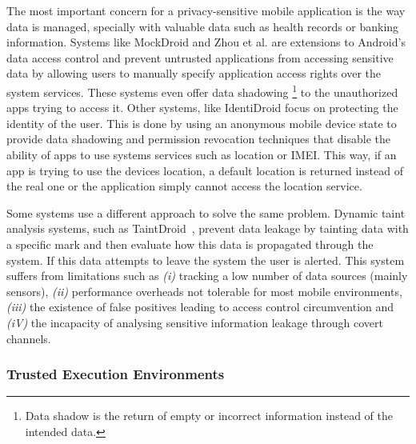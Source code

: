 The most important concern for a privacy-sensitive mobile application is the way data is managed, specially with valuable data such as health records or banking information. Systems like MockDroid \cite{beresford2011mockdroid} and Zhou et al. \cite{zhou2011taming} are extensions to Android's data access control and prevent untrusted applications from accessing sensitive data by allowing users to manually specify application access rights over the system services. These systems even offer data shadowing \footnote{Data shadow is the return of empty or incorrect information instead of the intended data.} to the unauthorized apps trying to access it. Other systems, like IdentiDroid \cite{shebaro2014identidroid} focus on protecting the identity of the user. This is done by using an anonymous mobile device state to provide data shadowing and permission revocation techniques that disable the ability of apps to use systems services such as location or \ac{IMEI}. This way, if an app is trying to use the devices location, a default location is returned instead of the real one or the application simply cannot access the location service.

Some systems use a different approach to solve the same problem. Dynamic taint analysis systems, such as TaintDroid~\cite{enck2014taintdroid}, prevent data leakage by tainting data with a specific mark and then evaluate how this data is propagated through the system. If this data attempts to leave the system the user is alerted. This system suffers from limitations such as \emph{(i)} tracking a low number of data sources (mainly sensors), \emph{(ii)} performance overheads not tolerable for most mobile environments, \emph{(iii)} the existence of false positives leading to access control circumvention and \emph{(iV)} the incapacity of analysing sensitive information leakage through covert channels.


\subsubsection{Trusted Execution Environments}

